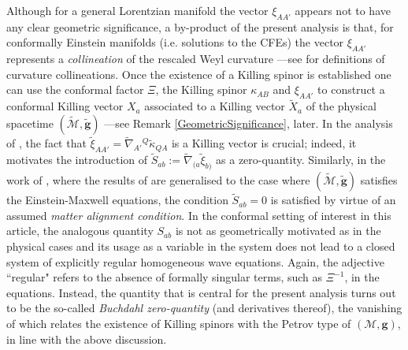 \documentclass[10pt,a4paper]{article}
\theoremstyle{plain}
\def\bmg{{\bm g}}
\begin{document}
Although for a general Lorentzian manifold
the vector $\xi_{AA'}$ appears not to have any clear geometric significance, a
by-product of the present analysis is that, for conformally Einstein
manifolds (i.e. solutions to the CFEs)
the vector $\xi_{AA'}$ represents a \emph{collineation} of the rescaled Weyl curvature ---see \cite{KatLevDav69} for definitions of curvature
collineations.  Once the existence of a Killing spinor is established
one can use the conformal factor $\Xi$, the Killing spinor
$\kappa_{AB}$ and $\xi_{AA'}$ to construct a conformal Killing vector
$X_{a}$ associated to a Killing vector $\tilde{X}_{a}$ of the physical
spacetime $(\tilde{\mathcal{M}},\tilde{\bmg})$ ---see Remark \ref{GeometricSignificance}, later. In the analysis of
\cite{GarVal08c}, the fact that
$\tilde{\xi}_{AA'}=\tilde{\nabla}_{A'}{}^{Q}\tilde{\kappa}_{QA}$ is a
Killing vector is crucial;
indeed, it motivates the introduction of
$\tilde{S}_{ab} := \tilde{\nabla}_{(a}\tilde{\xi}_{b)}$ as a
zero-quantity.  Similarly,
in the work of \cite{ValCol16}, where the results of \cite{GarVal08c}
are generalised to the case where $(\tilde{\mathcal{M}},\tilde{\bmg})$
satisfies the Einstein-Maxwell equations, the condition
$\tilde{S}_{ab}=0$ is satisfied by virtue of an assumed \emph{matter
alignment condition}. In the conformal setting of interest in this article, the analogous quantity $S_{ab}$ is not as geometrically
motivated as in the physical cases and its usage as a variable in the
system does not lead to a closed system of explicitly regular
homogeneous wave equations. Again, the adjective ``regular" refers to the absence of formally singular terms, such as $\Xi^{-1}$, in the
equations. Instead, the quantity that is central for the present
analysis turns out to be the so-called \emph{Buchdahl zero-quantity} (and
derivatives thereof), the vanishing of which relates the existence of Killing spinors with the Petrov type of $(\mathcal{M},\bmg)$, in line with the above discussion.
\end{document}
